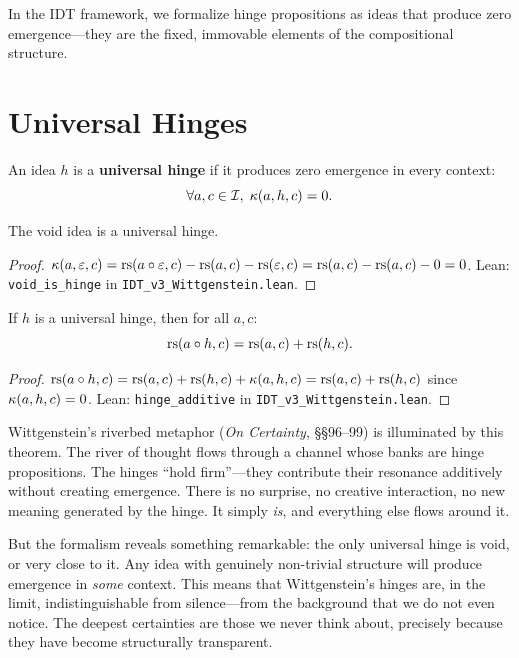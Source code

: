 In the IDT framework, we formalize hinge propositions as ideas that produce
zero emergence---they are the fixed, immovable elements of the compositional
structure.

\section{Universal Hinges}

\begin{definition}
\label{def:universal-hinge}
An idea $h$ is a \textbf{universal hinge} if it produces zero emergence
in every context:
\[
\forall a, c \in \mathcal{I},\; \kappa(a, h, c) = 0.
\]
\end{definition}

\begin{theorem}
\label{thm:void-hinge}
The void idea is a universal hinge.
\end{theorem}

\begin{proof}
$\kappa(a, \varepsilon, c) = \mathrm{rs}(a \circ \varepsilon, c) - \mathrm{rs}(a,c) - \mathrm{rs}(\varepsilon, c)
= \mathrm{rs}(a,c) - \mathrm{rs}(a,c) - 0 = 0$.
Lean: \texttt{void\_is\_hinge} in \texttt{IDT\_v3\_Wittgenstein.lean}.
\end{proof}

\begin{theorem}
\label{thm:hinge-additive}
If $h$ is a universal hinge, then for all $a, c$:
\[
\mathrm{rs}(a \circ h, c) = \mathrm{rs}(a, c) + \mathrm{rs}(h, c).
\]
\end{theorem}

\begin{proof}
$\mathrm{rs}(a \circ h, c) = \mathrm{rs}(a,c) + \mathrm{rs}(h,c) + \kappa(a,h,c) = \mathrm{rs}(a,c) + \mathrm{rs}(h,c)$
since $\kappa(a,h,c) = 0$.
Lean: \texttt{hinge\_additive} in \texttt{IDT\_v3\_Wittgenstein.lean}.
\end{proof}

\begin{interpretation}
\label{interp:riverbed}
Wittgenstein's riverbed metaphor (\textit{On Certainty}, \S\S96--99) is
illuminated by this theorem. The river of thought flows through a channel
whose banks are hinge propositions. The hinges ``hold firm''---they contribute
their resonance additively without creating emergence. There is no surprise,
no creative interaction, no new meaning generated by the hinge. It simply
\emph{is}, and everything else flows around it.

But the formalism reveals something remarkable: the only universal hinge is
void, or very close to it. Any idea with genuinely non-trivial structure
will produce emergence in \emph{some} context. This means that Wittgenstein's
hinges are, in the limit, indistinguishable from silence---from the background
that we do not even notice. The deepest certainties are those we never think
about, precisely because they have become structurally transparent.
\end{interpretation}

